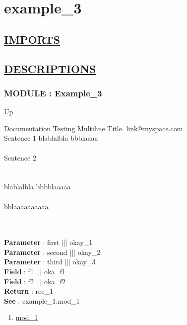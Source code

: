 \chapter*{example\_3}
\hypertarget{ecldoc:toc:example_3}{}

\section*{\underline{IMPORTS}}

\section*{\underline{DESCRIPTIONS}}
\subsection*{MODULE : Example\_3}
\hypertarget{ecldoc:Example_3}{}
\par
\begin{minipage}[t]{\textwidth}
\begin{flushleft}
  
\end{flushleft}
\end{minipage}
\hyperlink{ecldoc:toc:root}{Up} \\
\par
Documentation Testing Multiline Title. link@myspace.com  \\
 Sentence 1 blablalbla bbblaaaa  \\
 \\
 Sentence 2  \\
 \\
 \\
 blablalbla                    bbbblaaaaa \\
 \\
 bblaaaaaaaaaa \\
  \\
 \\
\par
\textbf{Parameter} : first ||| okay\_1 \\
\textbf{Parameter} : second ||| okay\_2 \\
\textbf{Parameter} : third ||| okay\_3 \\
\textbf{Field} : f1 ||| oka\_f1 \\
\textbf{Field} : f2 ||| oka\_f2 \\
\textbf{Return} : rec\_1 \\
\textbf{See} : example\_1.mod\_1 \\
\begin{enumerate}
\item \hyperlink{ecldoc:Example_3.mod_1}{mod\_1}
\end{enumerate}

